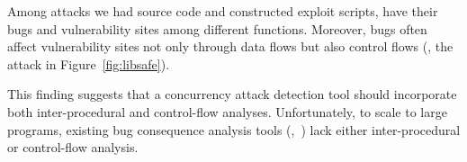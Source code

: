 


 Among \nreproduced attacks we had source code and constructed exploit 
scripts, \nreproducedInter have their bugs and vulnerability sites among 
different functions. Moreover, bugs often affect vulnerability sites not only 
through data flows but also control flows (\eg, the \libsafe attack in 
Figure~\ref{fig:libsafe}).

This finding suggests that a concurrency attack detection tool should 
incorporate both inter-procedural and control-flow analyses. Unfortunately, to 
scale to large programs, existing bug consequence analysis tools 
(\eg,~\cite{conseq:asplos11,yamaguchi:sp14,livshits05finding}) lack 
either inter-procedural or control-flow analysis.

